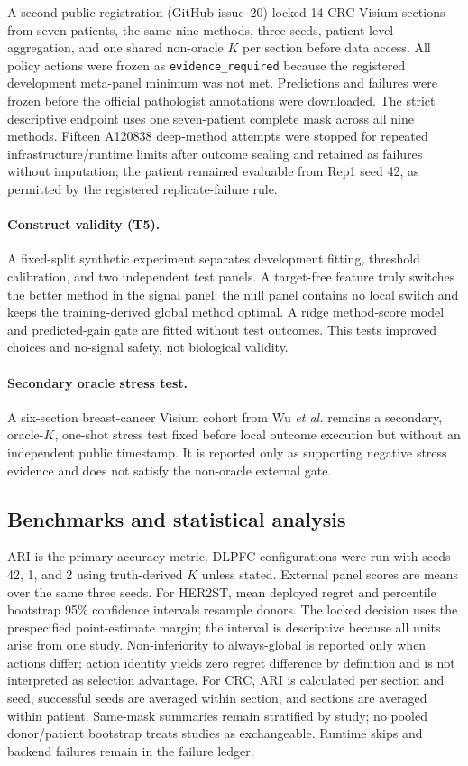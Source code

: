 \documentclass[12pt]{article}
\begin{document}
A second public registration (GitHub issue~20) locked 14 CRC Visium sections
from seven patients, the same nine methods, three seeds, patient-level
aggregation, and one shared non-oracle \(K\) per section before data access.
All policy actions were frozen as \texttt{evidence\_required} because the
registered development meta-panel minimum was not met. Predictions and
failures were frozen before the official pathologist annotations were
downloaded. The strict descriptive endpoint uses one seven-patient complete
mask across all nine methods. Fifteen A120838 deep-method attempts were stopped
for repeated infrastructure/runtime limits after outcome sealing and retained
as failures without imputation; the patient remained evaluable from Rep1 seed
42, as permitted by the registered replicate-failure rule.

\paragraph{Construct validity (T5).}
A fixed-split synthetic experiment separates development fitting, threshold
calibration, and two independent test panels. A target-free feature truly
switches the better method in the signal panel; the null panel contains no
local switch and keeps the training-derived global method optimal. A ridge
method-score model and predicted-gain gate are fitted without test outcomes.
This tests improved choices and no-signal safety, not biological validity.

\paragraph{Secondary oracle stress test.}
A six-section breast-cancer Visium cohort from Wu \textit{et al.}
\citep{wu2021} remains a secondary, oracle-\(K\), one-shot stress test fixed
before local outcome execution but without an independent public timestamp. It
is reported only as supporting negative stress evidence and does not satisfy
the non-oracle external gate.

\subsection{Benchmarks and statistical analysis}

ARI \citep{hubert1985} is the primary accuracy metric. DLPFC configurations
were run with seeds 42, 1, and 2 using truth-derived \(K\) unless stated.
External panel scores are means over the same three seeds. For HER2ST, mean
deployed regret and percentile bootstrap 95\% confidence intervals resample
donors. The locked decision uses the prespecified point-estimate margin; the
interval is descriptive because all units arise from one study. Non-inferiority
to always-global is reported only when actions differ; action identity yields
zero regret difference by definition and is not interpreted as selection
advantage.
For CRC, ARI is calculated per section and seed, successful seeds are averaged
within section, and sections are averaged within patient. Same-mask summaries
remain stratified by study; no pooled donor/patient bootstrap treats studies as
exchangeable. Runtime skips and backend failures remain in the failure ledger.
\end{document}
